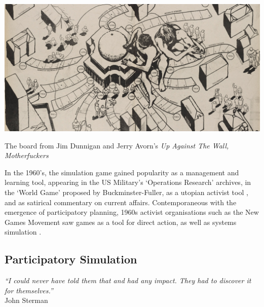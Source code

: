 \documentclass[nofonts,nols,justified,nobib]{tufte-book}
\begin{document}
\begin{marginfigure}
\includegraphics[width=\textwidth]{img/1/up-against-the-wall-motherfucker.jpg}
\caption{The board from Jim Dunnigan and Jerry Avorn's \emph{Up Against The Wall, Motherfuckers} \cite{dunnigan_few_1969}}
\end{marginfigure}

In the 1960's, the simulation game gained popularity as a management and learning tool, appearing in the US Military's `Operations Research' archives\cite{landa_war_1991}, in the `World Game' proposed by Buckminster-Fuller\cite{buckminster_fuller_institute_about_nodate}, as a utopian activist tool \cite{johnson_inside_2013}, and as satirical commentary on current affairs\cite{dunnigan_few_1969}.
Contemporaneous with the emergence of participatory planning, 1960s activist organisations such as the New Games Movement saw games as a tool for direct action, as well as systems simulation \cite{johnson_inside_2013}. 

\subsection*{Participatory Simulation}

\begin{flushright}
\emph{``I could never have told them that and had any impact. They had to discover it for themselves.''}\cite{sterman_john_2013}\\
John Sterman
\end{flushright}
\end{document}
